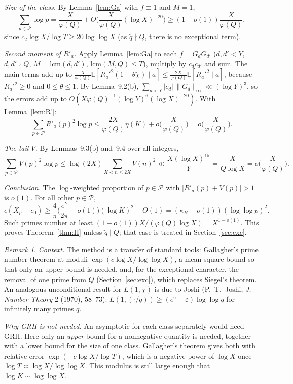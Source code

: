 \documentclass[11pt]{amsart}
\theoremstyle{remark}
\newtheorem{remark}[lemma]{Remark}
\newcommand{\E}{\mathbb{E}}
\begin{document}
\emph{Size of the class.} By Lemma~\ref{lem:Ga} with $f\equiv1$ and $M=1$,
\[
\sum_{p\in\mathcal P}\log p=\frac X{\varphi(Q)}+O\Big(\frac X{\varphi(Q)}(\log X)^{-20}\Big)\ge(1-o(1))\frac X{\varphi(Q)},
\]
since $c_2\log X/\log T\ge20\log\log X$ (as $\tilde q\nmid Q$, there is no exceptional term).

\emph{Second moment of $R'_a$.} Apply Lemma~\ref{lem:Ga} to each $f=G_dG_{d'}$ ($d,d'<Y$, $d,d'\nmid Q$, $M=\mathrm{lcm}(d,d')$, $\mathrm{lcm}(M,Q)\le T$), multiply by $c_dc_{d'}$ and sum. The main terms add up to $\frac X{\varphi(Q)}\E[R_a'^2(1-\theta\tilde\chi)\mid a]\le\frac{2X}{\varphi(Q)}\E[R_a'^2\mid a]$, because $R_a'^2\ge0$ and $0\le\theta\le1$. By Lemma~9.2(b), $\sum_{d<Y}|c_d|\,\|G_d\|_\infty\ll(\log Y)^3$, so the errors add up to $O(X\varphi(Q)^{-1}(\log Y)^6(\log X)^{-20})$. With Lemma~\ref{lem:R'}:
\[
\sum_{p\in\mathcal P}R'_a(p)^2\log p\le\frac{2X}{\varphi(Q)}\eta(K)+o\Big(\frac X{\varphi(Q)}\Big)=o\Big(\frac X{\varphi(Q)}\Big).
\]

\emph{The tail $V$.} By Lemmas~9.3(b) and~9.4 over all integers,
\[
\sum_{p\in\mathcal P}V(p)^2\log p\le\log(2X)\sum_{X<n\le2X}V(n)^2\ll\frac{X(\log X)^{15}}Y=\frac X{Q\log X}=o\Big(\frac X{\varphi(Q)}\Big).
\]

\emph{Conclusion.} The $\log$-weighted proportion of $p\in\mathcal P$ with $|R'_a(p)+V(p)|>1$ is $o(1)$. For all other $p\in\mathcal P$,
\[
\epsilon(X_p-c_0)\ge\frac4\pi\Big(\frac{e^\gamma}{2\pi}-o(1)\Big)(\log K)^2-O(1)=(\kappa_H-o(1))(\log\log p)^2 .
\]
Such primes number at least $(1-o(1))X/(\varphi(Q)\log X)=X^{1-o(1)}$. This proves Theorem~\ref{thm:H} unless $\tilde q\mid Q$; that case is treated in Section~\ref{sec:exc}.

\begin{remark}
\emph{Context.} The method is a transfer of standard tools: Gallagher's prime number theorem at moduli $\exp(c\log X/\log\log X)$, a mean-square bound so that only an upper bound is needed, and, for the exceptional character, the removal of one prime from $Q$ (Section~\ref{sec:exc}), which replaces Siegel's theorem. An analogous unconditional result for $L(1,\chi)$ is due to Joshi (P.~T.~Joshi, \emph{J. Number Theory} 2 (1970), 58--73): $L(1,(\cdot/q))\ge(e^\gamma-\varepsilon)\log\log q$ for infinitely many primes $q$.

\emph{Why GRH is not needed.} An asymptotic for each class separately would need GRH. Here only an \emph{upper} bound for a nonnegative quantity is needed, together with a lower bound for the size of one class. Gallagher's theorem gives both with relative error $\exp(-c\log X/\log T)$, which is a negative power of $\log X$ once $\log T\asymp\log X/\log\log X$. This modulus is still large enough that $\log K\sim\log\log X$.
\end{remark}
\end{document}
